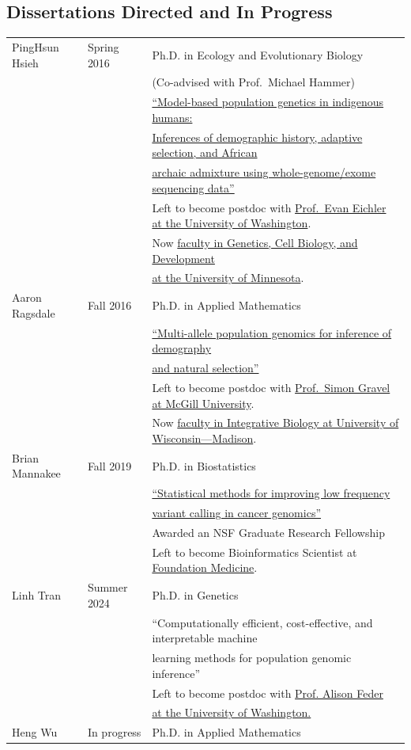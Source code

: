 \documentclass[11pt]{article}
\begin{document}
\subsection*{Dissertations Directed and In Progress}
\begin{longtable}[l]{l l l}
PingHsun Hsieh & Spring 2016 & Ph.D. in Ecology and Evolutionary Biology\\
 & & (Co-advised with Prof.\ Michael Hammer)\\
 & & \href{http://hdl.handle.net/10150/612540}{``Model-based population genetics in indigenous humans:}\\
 &&\href{http://hdl.handle.net/10150/612540}{Inferences of demographic history, adaptive selection, and African}\\
 &&\href{http://hdl.handle.net/10150/612540}{archaic admixture using whole-genome/exome sequencing data''}\\
 && Left to become postdoc with \href{https://eichlerlab.gs.washington.edu/}{Prof.\ Evan Eichler at the University of Washington}.\\
 && Now \href{https://hsiehph.github.io/}{faculty in Genetics, Cell Biology, and Development}\\
 && \href{https://hsiehph.github.io/}{at the University of Minnesota}.\\
Aaron Ragsdale & Fall 2016 & Ph.D. in Applied Mathematics\\
& & \href{http://hdl.handle.net/10150/622993}{``Multi-allele population genomics for inference of demography}\\
&&\href{http://hdl.handle.net/10150/622993}{and natural selection''}\\
&& Left to become postdoc with \href{http://simongravel.lab.mcgill.ca/}{Prof.\ Simon Gravel at McGill University}.\\
&&Now \href{https://apragsdale.github.io/}{faculty in Integrative Biology at University of Wisconsin—Madison}.\\
Brian Mannakee & Fall 2019 & Ph.D. in Biostatistics\\
& &\href{http://hdl.handle.net/10150/637708}{``Statistical methods for improving low frequency}\\
&&\href{http://hdl.handle.net/10150/637708}{variant calling in cancer genomics''}\\
&&Awarded an NSF Graduate Research Fellowship\\
&&Left to become Bioinformatics Scientist at \href{https://www.foundationmedicine.com}{Foundation Medicine}.\\ 
Linh Tran & Summer 2024 & Ph.D. in Genetics\\
&&``Computationally efficient, cost-effective, and interpretable machine\\
&&learning methods for population genomic inference''\\
&& Left to become postdoc with \href{https://federlab.github.io/}{Prof. Alison Feder}\\ && \href{https://federlab.github.io/}{at the University of Washington.}\\
Heng Wu & In progress & Ph.D. in Applied Mathematics\\
 \end{longtable}
\end{document}
